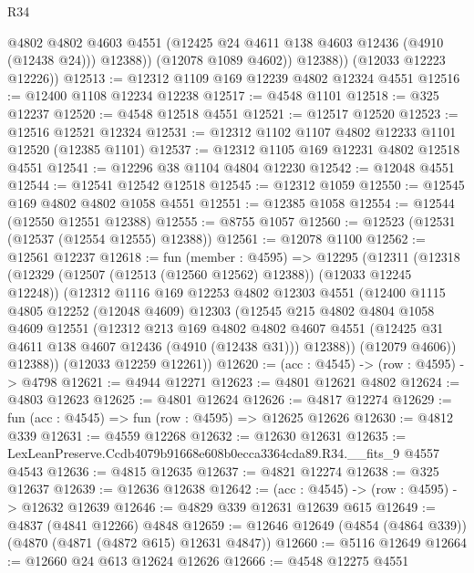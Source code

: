 \begin{lexlean}{R34}
\begin{coremodule}
                @4802
                @4802
                @4603
                @4551
                (@12425 @24 @4611 @138 @4603 @12436 (@4910 (@12438 @24)))
                @12388))
            (@12078 @1089 @4602))
          @12388))
      (@12033 @12223 @12226))
@12513 := @12312 @1109 @169 @12239 @4802 @12324 @4551
@12516 := @12400 @1108 @12234 @12238
@12517 := @4548 @1101
@12518 := @325 @12237
@12520 := @4548 @12518 @4551
@12521 := @12517 @12520
@12523 := @12516 @12521 @12324
@12531 := @12312 @1102 @1107 @4802 @12233 @1101 @12520 (@12385 @1101)
@12537 := @12312 @1105 @169 @12231 @4802 @12518 @4551
@12541 := @12296 @38 @1104 @4804 @12230
@12542 := @12048 @4551
@12544 := @12541 @12542 @12518
@12545 := @12312 @1059
@12550 := @12545 @169 @4802 @4802 @1058 @4551
@12551 := @12385 @1058
@12554 := @12544 (@12550 @12551 @12388)
@12555 := @8755 @1057
@12560 := @12523 (@12531 (@12537 (@12554 @12555) @12388))
@12561 := @12078 @1100
@12562 := @12561 @12237
@12618 := fun (member : @4595) =>
  @12295
    (@12311
      (@12318
        (@12329 (@12507 (@12513 (@12560 @12562) @12388)) (@12033 @12245 @12248))
        (@12312
          @1116
          @169
          @12253
          @4802
          @12303
          @4551
          (@12400
            @1115
            @4805
            @12252
            (@12048 @4609)
            @12303
            (@12545
              @215
              @4802
              @4804
              @1058
              @4609
              @12551
              (@12312
                @213
                @169
                @4802
                @4802
                @4607
                @4551
                (@12425 @31 @4611 @138 @4607 @12436 (@4910 (@12438 @31)))
                @12388))
            (@12079 @4606))
          @12388))
      (@12033 @12259 @12261))
@12620 := (acc : @4545) -> (row : @4595) -> @4798
@12621 := @4944 @12271
@12623 := @4801 @12621 @4802
@12624 := @4803 @12623
@12625 := @4801 @12624
@12626 := @4817 @12274
@12629 := fun (acc : @4545) => fun (row : @4595) => @12625 @12626
@12630 := @4812 @339
@12631 := @4559 @12268
@12632 := @12630 @12631
@12635 := LexLeanPreserve.Ccdb4079b91668e608b0ecca3364cda89.R34.__fits_9 @4557 @4543
@12636 := @4815 @12635
@12637 := @4821 @12274
@12638 := @325 @12637
@12639 := @12636 @12638
@12642 := (acc : @4545) -> (row : @4595) -> @12632 @12639
@12646 := @4829 @339 @12631 @12639 @615
@12649 := @4837 (@4841 @12266) @4848
@12659 := @12646 @12649 (@4854 (@4864 @339)) (@4870 (@4871 (@4872 @615) @12631 @4847))
@12660 := @5116 @12649
@12664 := @12660 @24 @613 @12624 @12626
@12666 := @4548 @12275 @4551

\end{coremodule}
\end{lexlean}
